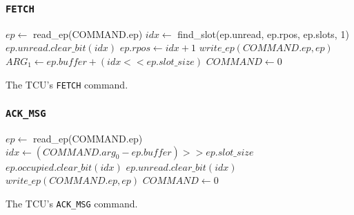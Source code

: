 \documentclass[a4paper,11pt,draft]{article}
\begin{document}
\subsubsection{\texttt{FETCH}}

\begin{algorithm}[H]
    $ep \gets$ read\_ep(COMMAND.ep)\;
    \BlankLine
    $idx \gets$ find\_slot(ep.unread, ep.rpos, ep.slots, 1)\;
    $ep.unread.clear\_bit(idx)$\;
    $ep.rpos \gets idx + 1$\;
    $write\_ep(COMMAND.ep, ep)$\;
    \BlankLine
    $ARG_1 \gets ep.buffer + (idx << ep.slot\_size)$\;
    $COMMAND \gets 0$\;
    \caption{The TCU's \texttt{FETCH} command.}
\end{algorithm}

\subsubsection{\texttt{ACK\_MSG}}

\begin{algorithm}[H]
    $ep \gets$ read\_ep(COMMAND.ep)\;
    \BlankLine
    $idx \gets (COMMAND.arg_0 - ep.buffer) >> ep.slot\_size$\;
    $ep.occupied.clear\_bit(idx)$\;
    $ep.unread.clear\_bit(idx)$\;
    $write\_ep(COMMAND.ep, ep)$\;
    \BlankLine
    \BlankLine
    $COMMAND \gets 0$\;
    \caption{The TCU's \texttt{ACK\_MSG} command.}
\end{algorithm}
\end{document}
